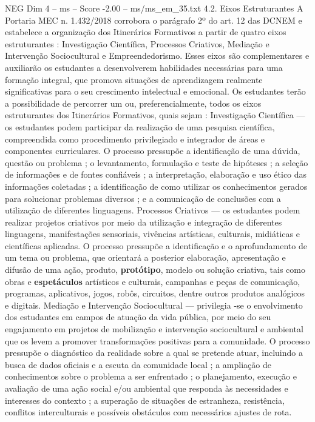 \begin{textsample}{NEG Dim 4 – ms – Score -2.00 – ms/ms\_em\_35.txt}  \label{ex:f4_neg_133}
4.2.
Eixos Estruturantes A Portaria MEC n. 1.432/2018 corrobora o parágrafo 2º do art. 12 das DCNEM e estabelece a organização dos Itinerários Formativos a partir de quatro eixos estruturantes : Investigação Científica, Processos Criativos, Mediação e Intervenção Sociocultural e Empreendedorismo.
Esses eixos são complementares e auxiliarão os estudantes a desenvolverem habilidades necessárias para uma formação integral, que promova situações de aprendizagem realmente significativas para o seu crescimento intelectual e emocional.
Os estudantes terão a possibilidade de percorrer um ou, preferencialmente, todos os eixos estruturantes dos Itinerários Formativos, quais sejam : Investigação Científica — os estudantes podem participar da realização de uma pesquisa científica, compreendida como procedimento privilegiado e integrador de áreas e componentes curriculares.
O processo pressupõe a identificação de uma dúvida, questão ou problema ; o levantamento, formulação e teste de hipóteses ; a seleção de informações e de fontes confiáveis ; a interpretação, elaboração e uso ético das informações coletadas ; a identificação de como utilizar os conhecimentos gerados para solucionar problemas diversos ; e a comunicação de conclusões com a utilização de diferentes linguagens.
Processos Criativos — os estudantes podem realizar projetos criativos por meio da utilização e integração de diferentes linguagens, manifestações sensoriais, vivências artísticas, culturais, midiáticas e científicas aplicadas.
O processo pressupõe a identificação e o aprofundamento de um tema ou problema, que orientará a posterior elaboração, apresentação e difusão de uma ação, produto, \textbf{protótipo}, modelo ou solução criativa, tais como obras e \textbf{espetáculos} artísticos e culturais, campanhas e peças de comunicação, programas, aplicativos, jogos, robôs, circuitos, dentre outros produtos analógicos e digitais.
Mediação e Intervenção Sociocultural — privilegia -se o envolvimento dos estudantes em campos de atuação da vida pública, por meio do seu engajamento em projetos de mobilização e intervenção sociocultural e ambiental que os levem a promover transformações positivas para a comunidade.
O processo pressupõe o diagnóstico da realidade sobre a qual se pretende atuar, incluindo a busca de dados oficiais e a escuta da comunidade local ; a ampliação de conhecimentos sobre o problema a ser enfrentado ; o planejamento, execução e avaliação de uma ação social e/ou ambiental que responda às necessidades e interesses do contexto ; a superação de situações de estranheza, resistência, conflitos interculturais e possíveis obstáculos com necessários ajustes de rota.

\end{textsample}
